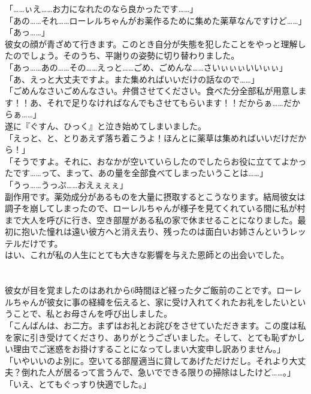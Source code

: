 \documentclass[oneside, a4paper]{jsbook}
\begin{document}
\noindent
「……ぃえ……お力になれたのなら良かったです……」\\
「あの……それ……ローレルちゃんがお薬作るために集めた薬草なんですけど……」\\
「あっ……」\\

彼女の顔が青ざめて行きます。このとき自分が失態を犯したことをやっと理解したのでしょう。そのうち、平謝りの姿勢に切り替わりました。\\

\noindent
「あっ……あの……その……えっと……ごめ、ごめんな……さいぃぃぃいいぃぃ」\\
「あ、えっと大丈夫ですよ。また集めればいいだけの話なので……」\\
「ごめんなさいごめんなさい。弁償させてください。食べた分全部私が用意します！！あ、それで足りなければなんでもさせてもらいます！！だからぁ……だからぁ……」\\

遂に『ぐすん、ひっく』と泣き始めてしまいました。\\

「えっと、と、とりあえず落ち着こうよ！ほんとに薬草は集めればいいだけだから！」\\
「そうですよ。それに、おなかが空いていらしたのでしたらお役に立ててよかったです……って、まって、あの量を全部食べてしまったいうことは……」\\
「うっ……うっぷ……おえぇぇぇ」\\

副作用です。薬効成分があるものを大量に摂取するとこうなります。結局彼女は調子を崩してしまったので、ローレルちゃんが様子を見てくれている間に私が村まで大人を呼びに行き、空き部屋がある私の家で休ませることになりました。最初に抱いた憧れは遠い彼方へと消え去り、残ったのは面白いお姉さんというレッテルだけです。\\

はい、これが私の人生にとても大きな影響を与えた恩師との出会いでした。\\\\\\

彼女が目を覚ましたのはあれから6時間ほど経った夕ご飯前のことです。ローレルちゃんが彼女に事の経緯を伝えると、家に受け入れてくれたお礼をしたいということで、私とお母さんを呼び出しました。\\

「こんばんは、お二方。まずはお礼とお詫びをさせていただきます。この度は私を家に引き受けてくださり、ありがとうございました。そして、とても恥ずかしい理由でご迷惑をお掛けすることになってしまい大変申し訳ありません。」\\
「いやいいのよ別に。空いてる部屋適当に貸してあげただけだし。それより大丈夫？倒れた人が居るって言うんで、急いでできる限りの掃除はしたけど……。」\\
「いえ、とてもぐっすり快適でした。」\\
\end{document}
